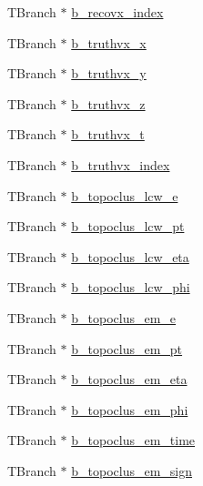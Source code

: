 \begin{DoxyCompactItemize}
T\+Branch $\ast$ \hyperlink{classJetAnalysisExample_aa04358f5e86a99a16239b75078e72562}{b\+\_\+recovx\+\_\+index}
\item 
T\+Branch $\ast$ \hyperlink{classJetAnalysisExample_a40780f73b07a4aef2e390564cfcfd738}{b\+\_\+truthvx\+\_\+x}
\item 
T\+Branch $\ast$ \hyperlink{classJetAnalysisExample_a52d78c66f138851987b86a3e364907a0}{b\+\_\+truthvx\+\_\+y}
\item 
T\+Branch $\ast$ \hyperlink{classJetAnalysisExample_a1f78ec3f136c0e795f2f1d44fe9e7763}{b\+\_\+truthvx\+\_\+z}
\item 
T\+Branch $\ast$ \hyperlink{classJetAnalysisExample_a5449dc03d8ce739db7f8187812f4bdb8}{b\+\_\+truthvx\+\_\+t}
\item 
T\+Branch $\ast$ \hyperlink{classJetAnalysisExample_a152aa6729df460221ac9aa2346dd4ded}{b\+\_\+truthvx\+\_\+index}
\item 
T\+Branch $\ast$ \hyperlink{classJetAnalysisExample_a9fee690dc6e65ebce8c091b829a513b6}{b\+\_\+topoclus\+\_\+lcw\+\_\+e}
\item 
T\+Branch $\ast$ \hyperlink{classJetAnalysisExample_a87a66106ca3550c8026e91c0adf438fa}{b\+\_\+topoclus\+\_\+lcw\+\_\+pt}
\item 
T\+Branch $\ast$ \hyperlink{classJetAnalysisExample_a56e07238e4a9c518dac39176f1b05b9f}{b\+\_\+topoclus\+\_\+lcw\+\_\+eta}
\item 
T\+Branch $\ast$ \hyperlink{classJetAnalysisExample_a0c495c5ce64dc4e7fccc66209ca30e87}{b\+\_\+topoclus\+\_\+lcw\+\_\+phi}
\item 
T\+Branch $\ast$ \hyperlink{classJetAnalysisExample_a47352c0452fe5cc79f3f6f1a99793cd7}{b\+\_\+topoclus\+\_\+em\+\_\+e}
\item 
T\+Branch $\ast$ \hyperlink{classJetAnalysisExample_a303421f926546f6df451479b17410634}{b\+\_\+topoclus\+\_\+em\+\_\+pt}
\item 
T\+Branch $\ast$ \hyperlink{classJetAnalysisExample_ace5eac0ccfff9ac4f779a2da580759d8}{b\+\_\+topoclus\+\_\+em\+\_\+eta}
\item 
T\+Branch $\ast$ \hyperlink{classJetAnalysisExample_ad2c1588defb6eaba70e867c5642f46c9}{b\+\_\+topoclus\+\_\+em\+\_\+phi}
\item 
T\+Branch $\ast$ \hyperlink{classJetAnalysisExample_a4ada13cc87d5f48b7a0988a50aefb849}{b\+\_\+topoclus\+\_\+em\+\_\+time}
\item 
T\+Branch $\ast$ \hyperlink{classJetAnalysisExample_a60e830ef627e668d9b1d658a513b4c2c}{b\+\_\+topoclus\+\_\+em\+\_\+sign}
\item 

\end{DoxyCompactItemize}

